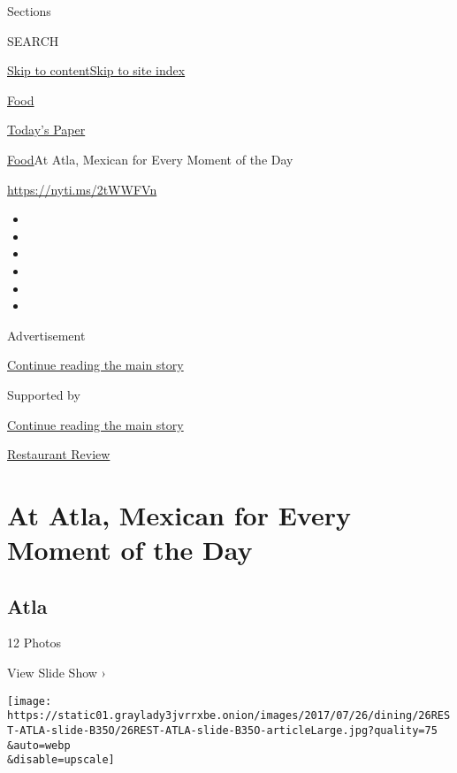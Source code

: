 Sections

SEARCH

\protect\hyperlink{site-content}{Skip to
content}\protect\hyperlink{site-index}{Skip to site index}

\href{https://www.nytimes3xbfgragh.onion/section/food}{Food}

\href{https://myaccount.nytimes3xbfgragh.onion/auth/login?response_type=cookie\&client_id=vi}{}

\href{https://www.nytimes3xbfgragh.onion/section/todayspaper}{Today's
Paper}

\href{/section/food}{Food}\textbar{}At Atla, Mexican for Every Moment of
the Day

\url{https://nyti.ms/2tWWFVn}

\begin{itemize}
\item
\item
\item
\item
\item
\item
\end{itemize}

Advertisement

\protect\hyperlink{after-top}{Continue reading the main story}

Supported by

\protect\hyperlink{after-sponsor}{Continue reading the main story}

\href{/column/restaurant-review}{Restaurant Review}

\hypertarget{at-atla-mexican-for-every-moment-of-the-day}{%
\section{At Atla, Mexican for Every Moment of the
Day}\label{at-atla-mexican-for-every-moment-of-the-day}}

\href{https://www.nytimes3xbfgragh.onion/slideshow/2017/07/25/dining/atla-nyc-review.html}{}

\hypertarget{atla}{%
\subsection{Atla}\label{atla}}

12 Photos

View Slide Show ›

\texttt{[image: https://static01.graylady3jvrrxbe.onion/images/2017/07/26/dining/26REST-ATLA-slide-B35O/26REST-ATLA-slide-B35O-articleLarge.jpg?quality=75\\\&auto=webp\\\&disable=upscale]}

